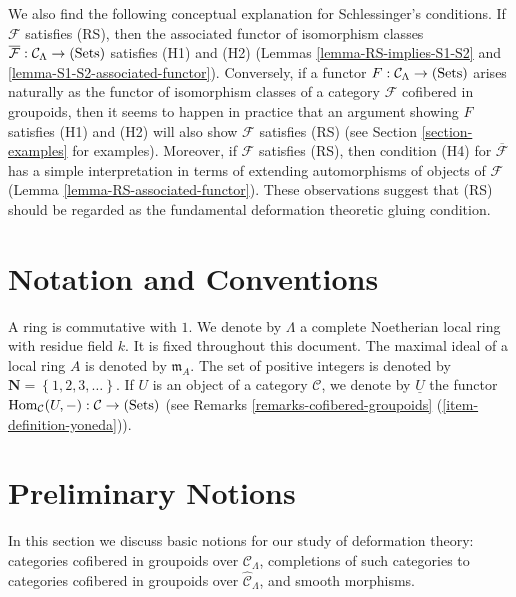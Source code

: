 \medskip \noindent
We also find the following conceptual explanation for Schlessinger's 
conditions.  If $\mathcal F$ satisfies (RS), then the associated functor of 
isomorphism classes $\overline{\mathcal F}: \mathcal C_{\Lambda} \rightarrow 
\textnormal{(Sets)}$ satisfies (H1) and (H2) (Lemmas 
\ref{lemma-RS-implies-S1-S2} and \ref{lemma-S1-S2-associated-functor}).  
Conversely, if a functor $F: \mathcal C_{\Lambda} \rightarrow 
\textnormal{(Sets)}$ arises naturally as the functor of isomorphism classes of 
a category $\mathcal F$ cofibered in groupoids, then it seems to happen in 
practice that an argument showing $F$ satisfies (H1) and (H2) will also show 
$\mathcal F$ satisfies (RS) (see Section \ref{section-examples} for examples).  
Moreover, if $\mathcal F$ satisfies (RS), then condition (H4) for 
$\overline{\mathcal F}$ has a simple interpretation in terms of extending 
automorphisms of objects of $\mathcal F$ (Lemma 
\ref{lemma-RS-associated-functor}).  These observations suggest that (RS) 
should be regarded as the fundamental deformation theoretic gluing condition.




\section{Notation and Conventions}
\label{section-notations-conventions}

\noindent
A ring is commutative with $1$. We denote by $\Lambda$ a complete Noetherian 
local ring with residue field $k$.  It is fixed throughout this document.  The 
maximal ideal of a local ring $A$ is denoted by $\mathfrak{m}_{A}$. The set of 
positive integers is denoted by $\mathbf{N} = \left\{1,2,3,\dots \right\}$.
If $U$ is an object of a category $\mathcal C$, we denote by $\underline{U}$ 
the functor $\textnormal{Hom}_{\mathcal C}(U,-): \mathcal C \rightarrow 
\textnormal{(Sets)}$ (see
Remarks \ref{remarks-cofibered-groupoids} (\ref{item-definition-yoneda})).




\section{Preliminary Notions}
\label{section-preliminary}

\noindent
In this section we discuss basic notions for our study of deformation theory: 
categories cofibered in groupoids over $\mathcal C_{\Lambda}$, completions of 
such categories to categories cofibered in groupoids over $\widehat{\mathcal 
C}_{\Lambda}$, and smooth morphisms.


